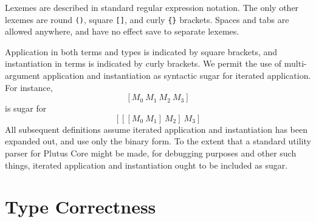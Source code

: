 \documentclass[a4paper]{article}
\newcommand{\inst}[2]{\texttt{\{}#1 ~ #2\texttt{\}}}
\newcommand{\app}[2]{\texttt{[} #1 ~ #2 \texttt{]}}
\newcommand{\appT}[2]{\texttt{[} #1 ~ #2 \texttt{]}}
\begin{document}
Lexemes are described in standard regular expression notation.  The only other
lexemes are round \texttt{()}, square \texttt{[]}, and curly \texttt{\{\}}
brackets.  Spaces and tabs are allowed anywhere, and have no effect
save to separate lexemes.

Application in both terms and types is indicated by square
brackets, and instantiation in terms is indicated by curly brackets. We
permit the use of multi-argument application and instantiation as
syntactic sugar for iterated application.
For instance,
\[
  [M_0 ~ M_1 ~ M_2 ~ M_3]
\]
is sugar for
\[
  [[[M_0 ~ M_1] ~ M_2] ~ M_3]
\]
All subsequent definitions assume iterated application and instantiation
has been expanded out, and use only the binary form. To the extent that
a standard utility parser for Plutus Core might be made, for debugging
purposes and other such things, iterated application and instantiation
ought to be included as sugar.
















%








\section{Type Correctness}
\end{document}
